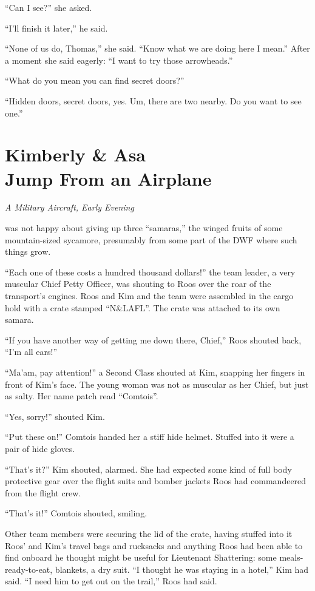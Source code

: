 \documentclass[11pt,a5paper]{article}
\newcommand{\alet}[1]{\textit{#1}\vspace{1em}}
\begin{document}
``Can I see?'' she asked.

``I'll finish it later,'' he said.

``None of us do, Thomas,'' she said. ``Know what we are doing here I mean.'' After a moment she said eagerly: ``I want to try those arrowheads.''

``What do you mean you can find secret doors?''

``Hidden doors, secret doors, yes. Um, there are two nearby. Do you want to see one.''

\newpage

\section{Kimberly \& Asa\\ Jump From an Airplane}

\alet{A Military Aircraft, Early Evening}

 was not happy about giving up three ``samaras,'' the winged fruits of some mountain-sized sycamore, presumably from some part of the DWF where such things grow.

``Each one of these costs a hundred thousand dollars!'' the team leader, a very muscular Chief Petty Officer, was shouting to Roos over the roar of the transport's engines. Roos and Kim and the team were assembled in the cargo hold with a crate stamped ``N\&LAFL''. The crate was attached to its own samara.

``If you have another way of getting me down there, Chief,'' Roos shouted back, ``I'm all ears!''

``Ma'am, pay attention!'' a Second Class shouted at Kim, snapping her fingers in front of Kim's face. The young woman was not as muscular as her Chief, but just as salty. Her name patch read ``Comtois''.

``Yes, sorry!'' shouted Kim.

``Put these on!'' Comtois handed her a stiff hide helmet. Stuffed into it were a pair of hide gloves.

``That's it?'' Kim shouted, alarmed. She had expected some kind of full body protective gear over the flight suits and bomber jackets Roos had commandeered from the flight crew.

``That's it!'' Comtois shouted, smiling.

Other team members were securing the lid of the crate, having stuffed into it Roos' and Kim's travel bags and rucksacks and anything Roos had been able to find onboard he thought might be useful for Lieutenant Shattering: some meals-ready-to-eat, blankets, a dry suit. ``I thought he was staying in a hotel,'' Kim had said. ``I need him to get out on the trail,'' Roos had said.
\end{document}
